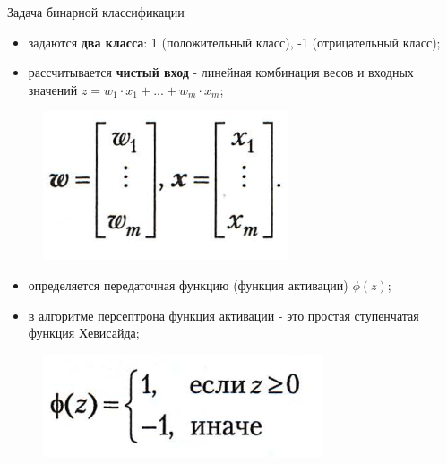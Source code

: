 \documentclass{beamer}
\begin{document}
\begin{frame}[t]{Задача бинарной классификации}
	\begin{itemize}
		\item задаются \textbf{два класса}: 1 (положительный класс), -1 (отрицательный класс);
		\item рассчитывается \textbf{чистый вход} - линейная комбинация весов и входных значений $z=w_1\cdot x_1+...+w_m\cdot x_m$;
	\end{itemize}
	\begin{figure}[h]
		\centering
		\includegraphics[scale=0.5]{images/lec03-pic02.png}
	\end{figure}
	\begin{itemize}
		\item определяется передаточная функцию (функция активации) $\phi(z)$;
		\item в алгоритме персептрона функция активации - это простая ступенчатая функция Хевисайда;
	\end{itemize}
	\begin{figure}[h]
		\centering
		\includegraphics[scale=0.4]{images/lec03-pic03.png}
	\end{figure}
\end{frame}
\end{document}
